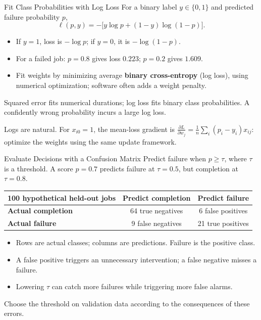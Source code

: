 \documentclass[aspectratio=169,10pt]{beamer}
\begin{document}
\begin{frame}{Fit Class Probabilities with Log Loss}
  For a binary label $y\in\{0,1\}$ and predicted failure probability $p$,
  \[
    \ell(p,y)=-\bigl[y\log p+(1-y)\log(1-p)\bigr].
  \]
  \begin{itemize}
    \item If $y=1$, loss is $-\log p$; if $y=0$, it is $-\log(1-p)$.
    \item For a failed job: $p=0.8$ gives loss $0.223$; $p=0.2$ gives $1.609$.
    \item Fit weights by minimizing average \textbf{binary cross-entropy} (log loss), using numerical optimization; software often adds a weight penalty.
  \end{itemize}
  \begin{keyidea}
    Squared error fits numerical durations; log loss fits binary class probabilities. A confidently wrong probability incurs a large log loss.
  \end{keyidea}
  \small Logs are natural. For $x_{i0}=1$, the mean-loss gradient is $\frac{\partial L}{\partial w_j}=\frac1n\sum_i(p_i-y_i)x_{ij}$: optimize the weights using the same update framework.
\end{frame}

\begin{frame}{Evaluate Decisions with a Confusion Matrix}
  \small
  Predict failure when $p\geq\tau$, where $\tau$ is a threshold.
  A score $p=0.7$ predicts failure at $\tau=0.5$, but completion at $\tau=0.8$.
  \begin{center}
    \renewcommand{\arraystretch}{1.3}
    \begin{tabular}{l|cc}
      \textbf{100 hypothetical held-out jobs} & \textbf{Predict completion} & \textbf{Predict failure} \\\hline
      \textbf{Actual completion} & 64 true negatives & 6 false positives \\
      \textbf{Actual failure} & 9 false negatives & 21 true positives
    \end{tabular}
  \end{center}
  \begin{itemize}
    \item Rows are actual classes; columns are predictions. Failure is the positive class.
    \item A false positive triggers an unnecessary intervention; a false negative misses a failure.
    \item Lowering $\tau$ can catch more failures while triggering more false alarms.
  \end{itemize}
  Choose the threshold on validation data according to the consequences of these errors.
\end{frame}
\end{document}
